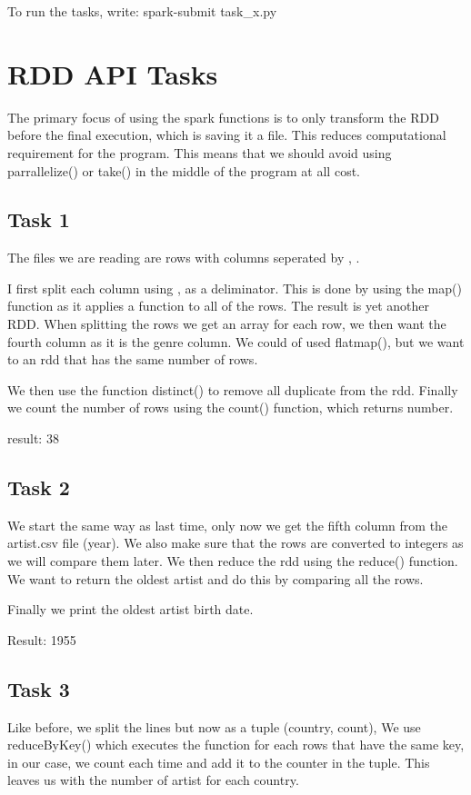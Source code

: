 \documentclass[12pt]{article}
\begin{document}
To run the tasks, write: spark-submit task\_x.py


\section{RDD API Tasks}

The primary focus of using the spark functions is to only transform the RDD before the final execution, which is saving it a file. This reduces computational requirement for the program. This means that we should avoid using parrallelize() or take() in the middle of the program at all cost.

\subsection{Task 1}

The files we are reading are rows with columns seperated by , .

I first split each column using , as a deliminator. This is done by using the map() function as it applies a function to all of the rows. The result is yet another RDD. When splitting the rows we get an array for each row, we then want the fourth column as it is the genre column. We could of used flatmap(), but we want to an rdd that has the same number of rows.

We then use the function distinct() to remove all duplicate from the rdd. Finally we count the number of rows using the count() function, which returns number.

result: 38

\subsection{Task 2}

We start the same way as last time, only now we get the fifth column from the artist.csv file (year). We also make sure that the rows are converted to integers as we will compare them later. We then reduce the rdd using the reduce() function. We want to return the oldest artist and do this by comparing all the rows.

Finally we print the oldest artist birth date.

Result: 1955

\subsection{Task 3}

Like before, we split the lines but now as a tuple (country, count), We use reduceByKey() which executes the function for each rows that have the same key, in our case, we count each time and add it to the counter in the tuple. This leaves us with the number of artist for each country.
\end{document}

